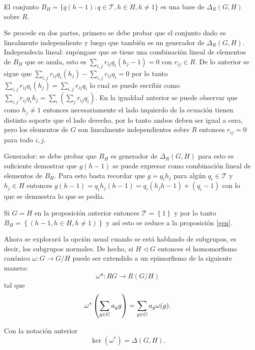 \begin{proposicion}
El conjunto $B_H = \{q(h-1) : q \in \mathcal{T}, h \in H, h \neq 1  \}$ es una base de $\Delta_R(G,H)$ sobre $R$.
\end{proposicion} 
\begin{proof*}
Se procede en dos partes, primero se debe probar que el conjunto dado es linealmente independiente y luego que también es un generador de $\Delta_R(G,H)$. 
Independecia lineal: supóngase que se tiene una combinación lineal de elementos de $B_H$ que se anula, esto es $\sum_{i,j}r_{ij}q_i(h_j-1) =0 $ con $r_{ij} \in R$. De lo anterior se sigue que $\sum_{i,j}r_{ij}q_i(h_j)-\sum_{i,j}r_{ij}q_i = 0$ por lo tanto $ \sum_{i,j}r_{ij}q_i(h_j) = \sum_{i,j}r_{ij}q_i $ lo cual se puede escribir como $\sum_{i,j}r_{ij}q_ih_j =  \sum_i\left( \sum_jr_{ij}q_i \right)$. En la igualdad anterior se puede observar que como $h_j \neq 1$ entonces necesariamente el lado izquierdo de la ecuación tienen distinto soporte que el lado derecho, por lo tanto ambos deben ser igual a cero, pero los elementos de $G$ son linealmente independientes sobre $R$ entonces $r_{ij} = 0$  para todo $i,j$.

Generador: se debe probar que $B_H$ es generador de $\Delta_R(G,H)$ para esto es suficiente demostrar que $g(h-1)$  se puede expresar  como combinación lineal de elementos de $B_H$. Para esto basta recordar que $g = q_ih_j$ para algún $q_i \in \mathcal{T}$ y $h_j \in H$ entonces $g(h-1) = q_ih_j(h-1) = q_i(h_jh-1)+ (q_i-1) $ con lo que se demuestra lo que se pedía. 
\end{proof*}
\begin{nota}
Si $G=H$ en la proposición anterior entonces $\mathcal{T} = \left\{ 1 \right\}$ y por lo tanto $B_H = \left\{ (h-1 , h \in H, h \neq 1) \right\}$ y así esto se reduce a la proposición \ref{gen}. 
\end{nota}
Ahora se explorará la opción usual cuando se está hablando de subgrupos, es decir, los subgrupos normales. De hecho, si $H \lhd G$ entonces el homomorfismo canónico $\omega : G \to G/H$ puede ser extendido a un epimorfismo de la siguiente manera: 
\[\omega* : RG \to R(G/H)\]
tal que 
\[\omega^*\left(\sum_{g \in G} a_{g} g \right) = \sum_{g \in G} a_g\omega(g).\]
\begin{proposicion}
Con la notación anterior
\[\ker(\omega^*) =\Delta(G,H).\]
\end{proposicion}
